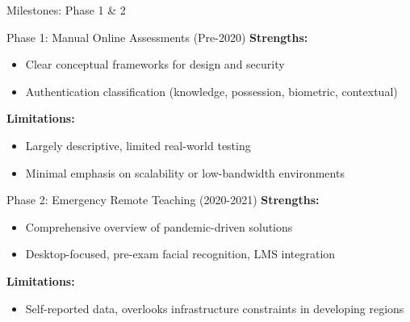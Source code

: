 \begin{frame}{Milestones: Phase 1 \& 2}
    \begin{block}{Phase 1: Manual Online Assessments (Pre-2020)}
        \textbf{Strengths:}
        \begin{itemize}
            \item Clear conceptual frameworks for design and security
            \item Authentication classification (knowledge, possession, biometric, contextual)
        \end{itemize}
        \textbf{Limitations:}
        \begin{itemize}
            \item Largely descriptive, limited real-world testing
            \item Minimal emphasis on scalability or low-bandwidth environments
        \end{itemize}
    \end{block}
    
    \begin{block}{Phase 2: Emergency Remote Teaching (2020-2021)}
        \textbf{Strengths:}
        \begin{itemize}
            \item Comprehensive overview of pandemic-driven solutions
            \item Desktop-focused, pre-exam facial recognition, LMS integration
        \end{itemize}
        \textbf{Limitations:}
        \begin{itemize}
            \item Self-reported data, overlooks infrastructure constraints in developing regions
        \end{itemize}
    \end{block}
\end{frame}

